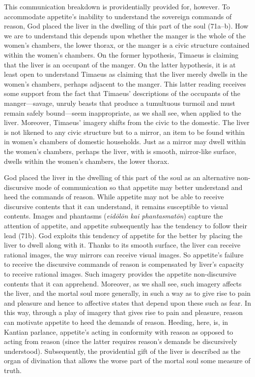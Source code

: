 This communication breakdown is providentially provided for, however. To accommodate appetite's inability to understand the sovereign commands of reason, God placed the liver in the dwelling of this part of the soul (71a--b). How we are to understand this depends upon whether the manger is the whole of the women's chambers, the lower thorax, or the manger is a civic structure contained within the women's chambers. On the former hypothesis, Timaeus is claiming that the liver is an occupant of the manger. On the latter hypothesis, it is at least open to understand Timaeus as claiming that the liver merely dwells in the women's chambers, perhaps adjacent to the manger. This latter reading receives some support from the fact that Timaeus' descriptions of the occupants of the manger---savage, unruly beasts that produce a tumultuous turmoil and must remain safely bound---seem inappropriate, as we shall see, when applied to the liver. Moreover, Timaeus' imagery shifts from the civic to the domestic. The liver is not likened to any civic structure but to a mirror, an item to be found within in women's chambers of domestic households. Just as a mirror may dwell within the women's chambers, perhaps the liver, with is smooth, mirror-like surface, dwells within the women's chambers, the lower thorax.

God placed the liver in the dwelling of this part of the soul as an alternative non-discursive mode of communication so that appetite may better understand and heed the commands of reason. While appetite may not be able to receive discursive contents that it can understand, it remains susceptible to visual contents. Images and phantasms (\emph{eidōlōn kai phantasmatōn}) capture the attention of appetite, and appetite subsequently has the tendency to follow their lead (71b). God exploits this tendency of appetite for the better by placing the liver to dwell along with it. Thanks to its smooth surface, the liver can receive rational images, the way mirrors can receive visual images. So appetite's failure to receive the discursive commands of reason is compensated by liver's capacity to receive rational images. Such imagery provides the appetite non-discursive contents that it can apprehend. Moreover, as we shall see, such imagery affects the liver, and the mortal soul more generally, in such a way as to give rise to pain and pleasure and hence to affective states that depend upon these such as fear. In this way, through a play of imagery that gives rise to pain and pleasure, reason can motivate appetite to heed the demands of reason. Heeding, here, is, in Kantian parlance, appetite's acting in conformity with reason as opposed to acting from reason (since the latter requires reason's demands be discursively understood). Subsequently, the providential gift of the liver is described as the organ of divination that allows the worse part of the mortal soul some measure of truth. 

